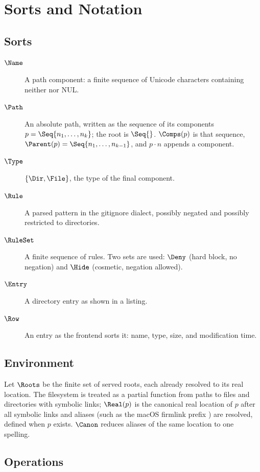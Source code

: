 \section{Sorts and Notation}

\subsection{Sorts}

\begin{description}
  \item[$\Name$] A path component: a finite sequence of Unicode characters
        containing neither \code{/} nor NUL.
  \item[$\Path$] An absolute path, written as the sequence of its components
        $p=\Seq{n_1,\dots,n_k}$; the root is $\Seq{}$.  $\Comps(p)$ is that
        sequence, $\Parent(p)=\Seq{n_1,\dots,n_{k-1}}$, and $p\cdot n$ appends a
        component.
  \item[$\Type$] $\{\Dir,\File\}$, the type of the final component.
  \item[$\Rule$] A parsed pattern in the gitignore dialect, possibly negated and
        possibly restricted to directories.
  \item[$\RuleSet$] A finite sequence of rules.  Two sets are used: $\Deny$
        (hard block, no negation) and $\Hide$ (cosmetic, negation allowed).
  \item[$\Entry$] A directory entry as shown in a listing.
  \item[$\Row$] An entry as the frontend sorts it: name, type, size, and
        modification time.
\end{description}

\subsection{Environment}

Let $\Roots$ be the finite set of served roots, each already resolved to its
real location.  The filesystem is treated as a partial function from paths to
files and directories with symbolic links; $\Real(p)$ is the canonical real
location of $p$ after all symbolic links and aliases (such as the macOS
firmlink prefix ) are resolved, defined when $p$
exists.  $\Canon$ reduces aliases of the same location to one spelling.

\subsection{Operations}

